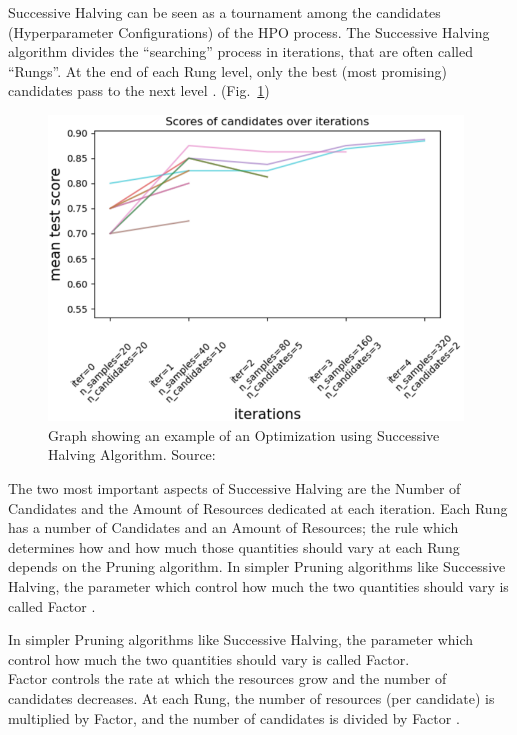 Successive Halving can be seen as a tournament among the candidates (Hyperparameter Configurations) of the HPO process.
The Successive Halving algorithm divides the “searching” process in iterations, that are often called “Rungs”. At the end of each Rung level, only the best (most promising) candidates pass to the next level \cite{Tesi-1.7} \cite{OptunaPruners-SuccessiveHalvingAlgorithm}. (Fig.~\ref{fig:figure-2.3.3})
\begin{figure}[t]
	\centering
	\includegraphics[width=11cm]{figures/figure-2.3.3.png}
	\caption[Successive Halving Algorithm Example]{Graph showing an example of an Optimization using Successive Halving Algorithm. Source:~\cite{Tesi-1.7}}
	\label{fig:figure-2.3.3}
\end{figure}

The two most important aspects of Successive Halving are the Number of Candidates and the Amount of Resources dedicated at each iteration.
Each Rung has a number of Candidates and an Amount of Resources; the rule which determines how and how much those quantities should vary at each Rung depends on the Pruning algorithm.
In simpler Pruning algorithms like Successive Halving, the parameter which control how much the two quantities should vary is called Factor \cite{OptunaPruners-SuccessiveHalvingAlgorithm}.

In simpler Pruning algorithms like Successive Halving, the parameter which control how much the two quantities should vary is called Factor.
\\[0.3cm]Factor controls the rate at which the resources grow and the number of candidates decreases.
At each Rung, the number of resources (per candidate) is multiplied by Factor, and the number of candidates is divided by Factor \cite{OptunaPruners-SuccessiveHalvingAlgorithm}.

